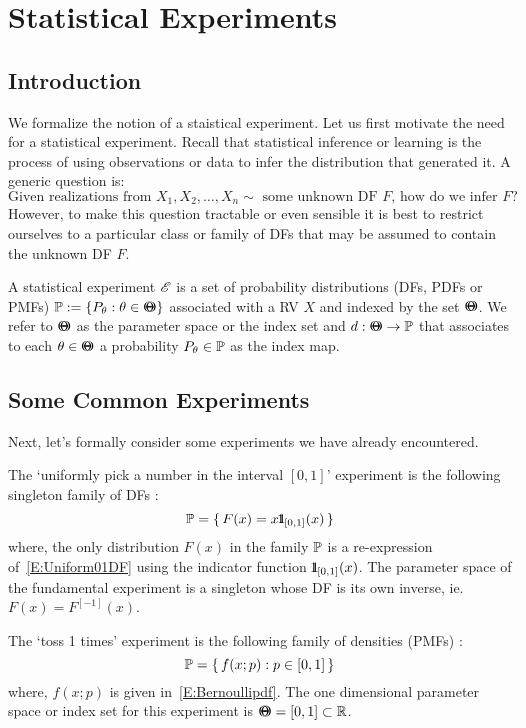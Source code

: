 \chapter{Statistical Experiments}\label{S:StatExps}
\section{Introduction}
We formalize the notion of a staistical experiment.  Let us first motivate the need for a statistical experiment.  Recall that statistical inference or learning is the process of using observations or data to infer the distribution that generated it.  A generic question is:
\[
\text{Given realizations from $X_1, X_2, \ldots, X_n \sim$ some unknown DF $F$, how do we infer $F$} ?
\]
However, to make this question tractable or even sensible it is best to restrict ourselves to a particular  class or family of DFs that may be assumed to contain the unknown DF $F$.
\begin{definition}[Experiment]
A statistical experiment $\mathscr{E}$ is a set of probability distributions (DFs, PDFs or PMFs) $\mathbb{P} := \{P_{\theta} : \theta \in {\Theta}\mspace{-11 mu}{\Theta} \}$ associated with a RV $X$ and indexed by the set ${\Theta}\mspace{-11 mu}{\Theta}$.  We refer to ${\Theta}\mspace{-11 mu}{\Theta}$ as the parameter space or the index set and $d:{\Theta}\mspace{-11 mu}{\Theta} \rightarrow \mathbb{P}$ that associates to each $\theta \in {\Theta}\mspace{-11 mu}{\Theta}$ a probability $P_{\theta} \in \mathbb{P}$ as the index map.
\end{definition}
\section{Some Common Experiments}
Next, let's formally consider some experiments we have already encountered.
\begin{Exp}\label{Exp:Uniform01}
The `uniformly pick a number in the interval $[0,1]$' experiment is the following singleton family of DFs  :
\[
\mathbb{P} = \{ \,  F(x) = x {1}\mspace{-11 mu}{1}_{[0,1]}(x)  \, \} 
\]
where, the only distribution $F(x)$ in the family $\mathbb{P}$ is a re-expression of~\eqref{E:Uniform01DF} using the indicator function ${1}\mspace{-11 mu}{1}_{[0,1]}(x)$.  The parameter space of the fundamental experiment is a singleton whose DF is its own inverse, ie.~$F(x) = F^{[-1]}(x)$.
\end{Exp}

\begin{Exp}[Bernoulli]\label{Exp:Bernoulli}
The `toss 1 times' experiment is the following family of densities (PMFs) :
\[
\mathbb{P} = \{ \,  f(x; p) :  p \in [0,1] \, \} 
\]
where, $f(x; p)$ is given in~\eqref{E:Bernoullipdf}.  The one dimensional parameter space or index set for this experiment is  ${\Theta}\mspace{-11 mu}{\Theta} = [0,1] \subset \mathbb{R}$.
\end{Exp}

